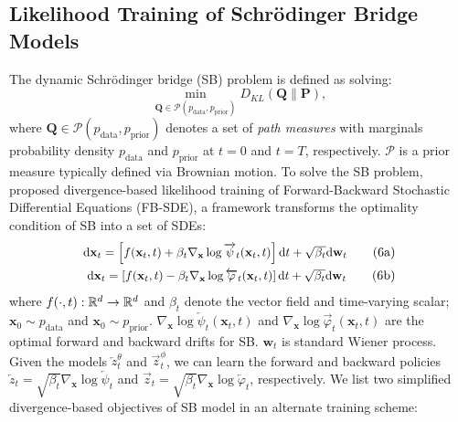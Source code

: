 \subsection{Likelihood Training of Schrödinger Bridge Models}\label{sec: fb-sde}
The dynamic Schrödinger bridge (SB) problem is defined as solving:
\begin{equation}
    \min_{\mathbf{Q} \in \mathcal{P}(p_{\text{data}}, p_{\text{prior}})} D_{KL}(\mathbf{Q} \parallel \mathbf{P}),
\end{equation}
where ${\mathbf{Q} \in \mathcal{P}(p_{\text{data}}, p_{\text{prior}})}$ denotes a set of \textit{path measures} with marginals probability density $p_{\text{data}}$ and $p_{\text{prior}}$ at $t=0$ and $t=T$, respectively. $\mathcal{P}$ is a prior measure typically defined via Brownian motion.
To solve the SB problem, \citet{forward_backward_SDE} proposed divergence-based likelihood training of Forward-Backward Stochastic Differential Equations (FB-SDE), a framework transforms the optimality condition of SB into a set of SDEs:
\begin{align}
\scalebox{0.95}{$
    \mathrm{d}\mathbf{x}_t = \left[f(\mathbf{x}_t, t) + \beta_t \nabla_{\mathbf{x}} \log \overrightarrow{\psi}_t(\mathbf{x}_t, t)\right]\mathrm{d}t + \sqrt{\beta_t}\mathrm{d}\mathbf{w}_t $}\tag{6a}\label{eq: fb-sde-b}\\
    \scalebox{0.95}{$
    \mathrm{d}\mathbf{x}_t = \left[f(\mathbf{x}_t, t) - \beta_t \nabla_{\mathbf{x}} \log \overleftarrow{\varphi}_t(\mathbf{x}_t, t)\right]
    \mathrm{d}t + \sqrt{\beta_t}\mathrm{d}\mathbf{w}_t $}\tag{6b}\label{eq: fb-sde-f}
\end{align}
where $f(\cdot, t):\mathbb{R}^d\rightarrow\mathbb{R}^d$ and $\beta_t$ denote the vector field and time-varying scalar; $\mathbf{x}_0 \sim p_{\text{data}}$ and $\mathbf{x}_0 \sim p_{\text{prior}}$. 
$\nabla_{\mathbf{x}} \log \overleftarrow{\psi}_t(\mathbf{x}_t, t)$ and $\nabla_{\mathbf{x}} \log \overrightarrow{\varphi}_t(\mathbf{x}_t, t)$ are the optimal forward and backward drifts for SB.
$\mathbf{w}_t$ is standard Wiener process.
Given the models $\overleftarrow{z}_t^\theta$ and $\overrightarrow{z}_t^\phi$, we can learn the forward and backward policies $\overleftarrow{z}_t = \sqrt{\beta_t}\nabla_{\mathbf{x}} \log \overleftarrow{\psi}_t$ and $\overrightarrow{z}_t = \sqrt{\beta_t}\nabla_{\mathbf{x}} \log \overleftarrow{\varphi}_t$, respectively. 
We list two simplified divergence-based objectives of SB model in an alternate training scheme:
